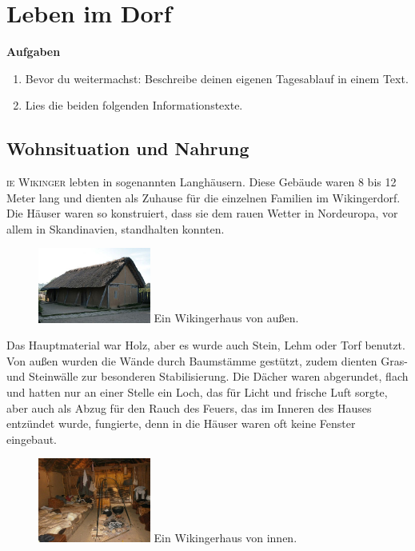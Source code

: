 \documentclass[12pt,a4paper,ngerman,openany]{book}
\newcommand{\flettrine}[2]{\lettrine[lines=2, depth=0, loversize=0.25, nindent=0.69pt, lraise=0.15]{\initfamily{#1}}{#2}}
\newcommand*\initfamily{\usefont{U}{GotIn}{xl}{n}}
\newcommand{\aufgaben}[1]{
  \begin{tcolorbox}
    \textbf{Aufgaben}
    \begin{enumerate}
      #1
    \end{enumerate}
  \end{tcolorbox}
} %
\begin{document}
\pagebreak

\section{Leben im Dorf}

\aufgaben{
  \item Bevor du weitermachst: Beschreibe deinen eigenen Tagesablauf in einem Text.
  \item Lies die beiden folgenden Informationstexte.
}

\subsection{Wohnsituation und Nahrung}
\flettrine{D}{ie Wikinger} lebten in sogenannten \glqq Langhäusern\grqq{}. Diese Gebäude waren 8 bis 12 Meter lang und dienten als Zuhause für die einzelnen Familien im Wikingerdorf. Die Häuser waren so konstruiert, dass sie dem rauen Wetter in Nordeuropa, vor allem in Skandinavien, standhalten konnten.

\begin{figure}
  \centering
  \includegraphics[width=0.33\textwidth]{aussen.jpeg}
  Ein Wikingerhaus von außen.
\end{figure}

Das Hauptmaterial war Holz, aber es wurde auch Stein, Lehm oder Torf benutzt. Von außen wurden die Wände durch Baumstämme gestützt, zudem dienten Gras- und Steinwälle zur besonderen Stabilisierung. Die Dächer waren abgerundet, flach und hatten nur an einer Stelle ein Loch, das für Licht und frische Luft sorgte, aber auch als Abzug für den Rauch des Feuers, das im Inneren des Hauses entzündet wurde, fungierte, denn in die Häuser waren oft keine Fenster eingebaut.


\begin{figure}
  \centering
  \includegraphics[width=0.33\textwidth]{innen.jpeg}
  Ein Wikingerhaus von innen.
\end{figure}
\end{document}
